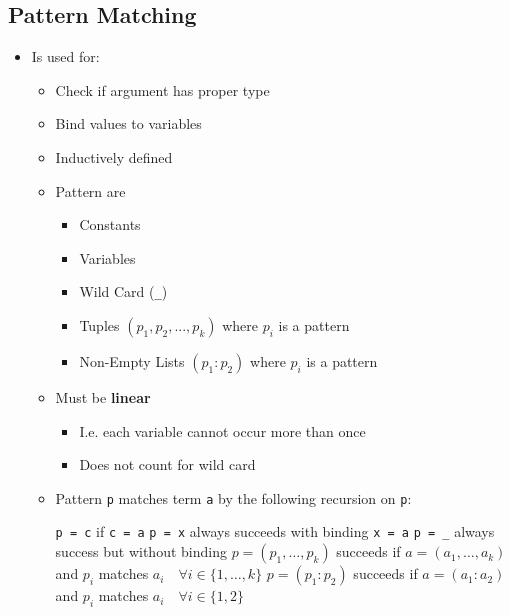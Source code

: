 \subsection{Pattern Matching}
\begin{itemize}
    \item Is used for:
        \begin{itemize}
            \item Check if argument has proper type
            \item Bind values to variables
        \end{itemize}
        \begin{itemize}
            \item Inductively defined
            \item Pattern are
                \begin{itemize}
                    \item Constants
                    \item Variables
                    \item Wild Card (\verb+_+)
                    \item Tuples $(p_1, p_2, ... , p_k)$ where $p_i$ is a pattern
                    \item Non-Empty Lists $(p_1 : p_2)$ where $p_i$ is a pattern
                \end{itemize}
            \item Must be \textbf{linear}
                \begin{itemize}
                    \item I.e. each variable cannot occur more than once
                    \item Does not count for wild card
                \end{itemize}
        \end{itemize}
        \begin{itemize}
            \item Pattern \verb+p+ matches term \verb+a+ by the following recursion on \verb+p+:
                \begin{itemize}
                     \verb+p = c+ if \verb+c = a+
                     \verb+p = x+ always succeeds with binding \verb+x = a+
                     \verb+p = _+ always success but without binding
                     $p = (p_1, \dots , p_k)$ succeeds if $a = (a_1, \dots , a_k)$ and $p_i$ matches $a_i \quad \forall i \in \{1, \dots , k\} $
                     $p = (p_1 : p_2)$ succeeds if $a = (a_1 : a_2)$ and $p_i$ matches $a_i \quad \forall i \in \{1, 2\}$
                \end{itemize}
        \end{itemize}
\end{itemize}

